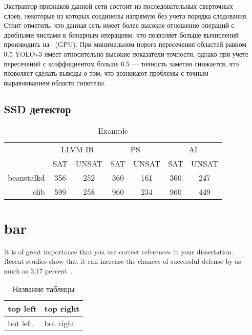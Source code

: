 Экстрактор признаков данной сети состоит из последовательных сверточных слоев, некоторые из которых соединены напрямую без учета порядка следования. Стоит отметить, что данная сеть имеет более высокое отношение операций с дробными числами к бинарным операциям, что позволяет больше вычислений производить на ~(GPU).
При минимальном пороге пересечения областей равном 0.5 YOLOv3 имеет относительно высокие показатели точности, однако при учете пересечений с коэффициентом больше 0.5 — точность заметно снижается, что позволяет сделать выводы о том, что возникают проблемы с точным выравниванием области гипотезы.

\subsection{SSD детектор}

\begin{table}
\captionsetup{skip=5pt}
\caption{Example}
\centering
\begin{tabular}{|r|c|c|c|c|c|c|}
\hline
            \multirow{2}{*}{}
           & \multicolumn{2}{c|}{LLVM IR} 
           & \multicolumn{2}{c|}{PS} 
           & \multicolumn{2}{c|}{AI} \\ \cline{2-7}
           & SAT    & UNSAT   & SAT    & UNSAT   & SAT    & UNSAT   \\ \hline
beanstalkd & 356    & 252     & 360    & 161     & 360    & 247     \\ \hline
clib       & 599    & 258     & 960    & 234     & 960    & 449     \\ \hline
\end{tabular}
\label{table:checkResults}
\end{table}

\section{bar}

\blindtext
It is of great importance that you use correct references in your dissertation.
Resent studies show that it can increase the chances of successful defense
by as much as 3,17 percent~\cite{one}.

\begin{table}[H]
	\caption{Название таблицы}
	\begin{center}
		\begin{tabular}{|l|l|}
			\hline
			top left & top right\\ \hline
			bot left & bot right\\ \hline
		\end{tabular}
		\label{tabular:tab_examp}
	\end{center}
\end{table}


\Blindtext
